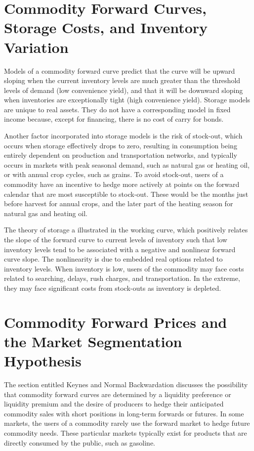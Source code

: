 \documentclass[11pt]{article}
\begin{document}
\section*{Commodity Forward Curves, Storage Costs, and Inventory Variation}
Models of a commodity forward curve predict that the curve will be upward sloping when the current inventory levels are much greater than the threshold levels of demand (low convenience yield), and that it will be downward sloping when inventories are exceptionally tight (high convenience yield). Storage models are unique to real assets. They do not have a corresponding model in fixed income because, except for financing, there is no cost of carry for bonds.

Another factor incorporated into storage models is the risk of stock-out, which occurs when storage effectively drops to zero, resulting in consumption being entirely dependent on production and transportation networks, and typically occurs in markets with peak seasonal demand, such as natural gas or heating oil, or with annual crop cycles, such as grains. To avoid stock-out, users of a commodity have an incentive to hedge more actively at points on the forward calendar that are most susceptible to stock-out. These would be the months just before harvest for annual crops, and the later part of the heating season for natural gas and heating oil.

The theory of storage a illustrated in the working curve, which positively relates the slope of the forward curve to current levels of inventory such that low inventory levels tend to be associated with a negative and nonlinear forward curve slope. The nonlinearity is due to embedded real options related to inventory levels. When inventory is low, users of the commodity may face costs related to searching, delays, rush charges, and transportation. In the extreme, they may face significant costs from stock-outs as inventory is depleted.

\section*{Commodity Forward Prices and the Market Segmentation Hypothesis}
The section entitled Keynes and Normal Backwardation discusses the possibility that commodity forward curves are determined by a liquidity preference or liquidity premium and the desire of producers to hedge their anticipated commodity sales with short positions in long-term forwards or futures. In some markets, the users of a commodity rarely use the forward market to hedge future commodity needs. These particular markets typically exist for products that are directly consumed by the public, such as gasoline.
\end{document}
